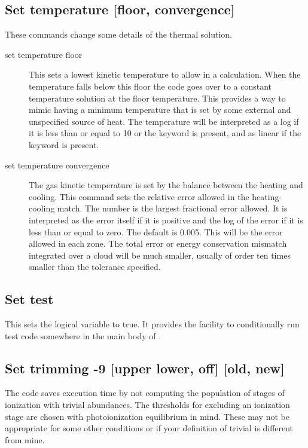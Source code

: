 \subsection{Set temperature [floor, convergence]}
\label{sec:SetTemperatureOptions}

These commands change some details of the thermal solution.
\begin{description}
\item[set temperature floor]  This sets a lowest kinetic temperature
to allow in a calculation.
When the temperature falls below this floor the code
goes over to a constant temperature solution at the floor temperature.
This provides a way to mimic having a minimum temperature that
is set by some external and unspecified source of heat.
The temperature will be interpreted as a log if it is less than
or equal to 10 or the keyword  is present, and as
linear if the keyword  is present.

\item[set temperature convergence]  The gas kinetic temperature
is set by the balance
between the heating and cooling.
This command sets the relative error
allowed in the heating-cooling match.
The number is the largest fractional
error allowed.
It is interpreted as the error itself if it is positive
and the log of the error if it is less than or equal to zero.
The default is 0.005.
This will be the error allowed in each zone.
The total error
or energy conservation mismatch integrated over a cloud will be much smaller,
usually of order ten times smaller than the tolerance specified.
\end{description}

\subsection{Set test}

This sets the logical variable  to true.
It provides
the facility to conditionally run test code somewhere
in the main body of \Cloudy.

\subsection{Set trimming -9  [upper lower, off] [old, new]}

The code saves execution time by not computing the population of stages
of ionization with trivial abundances.
The thresholds for excluding an
ionization stage are chosen with photoionization equilibrium in mind.  These
may not be appropriate for some other conditions or if your definition of
trivial is different from mine.

